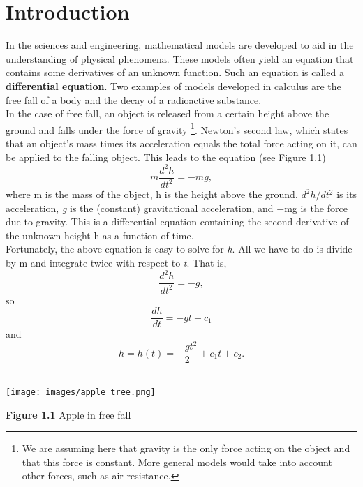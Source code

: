 \documentclass{article}
\begin{document}
\section{Introduction}
In the sciences and engineering, mathematical models are developed to aid in the understanding of physical phenomena. These models often yield an equation that contains some derivatives of an unknown function. Such an equation is called a \textbf{differential equation}.
Two examples of models developed in calculus are the free fall of a body and the decay of a radioactive substance.\\
\indent\setlength{\parindent}{1em} In the case of free fall, an object is released from a certain height above the ground and falls under the force of gravity \footnote {We are assuming here that gravity is the only force acting on the object and that this force is constant. More general models would take into account other forces, such as air resistance.}. Newton’s second law, which states that an object’s mass times its acceleration equals the total force acting on it, can be applied to the falling object. This leads to the equation (see Figure 1.1)\\ 
\begin{equation}
    m\frac{d^2h}{dt^2} = -mg,
\end{equation}
where m is the mass of the object, h is the height above the ground, \begin{math} d^2h/dt^2 \end{math} is its acceleration, \textsl{g} is the (constant) gravitational acceleration, and $-$mg is the force due to gravity. This is a differential equation containing the second derivative of the unknown height h as a function of time.
\\
\indent\setlength{\parindent}{1em} Fortunately, the above equation is easy to solve for \textsl{h}. All we have to do is divide by m and integrate twice with respect to \textsl{t}. That is,
\begin{equation}
\frac{d^2h}{dt^2} = -g,
\end{equation}
so
\begin{equation}
\frac{dh}{dt} = -gt +c_1
\end{equation}
and
\begin{equation}
h = h(t) = \frac{-gt^2}{2} +c_1t +c_2 .
\end{equation}
\\
\begin{center}
\texttt{[image: images/apple tree.png]}
\end{center}
\begin{center}
\textbf{Figure 1.1} Apple in free fall
\end{center}
\end{document}
